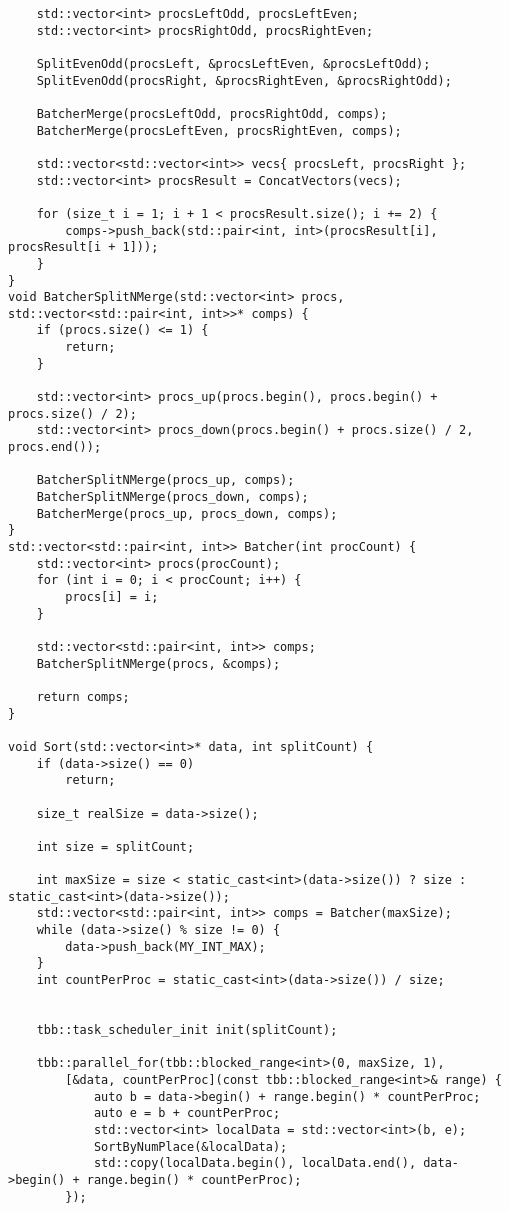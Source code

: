\documentclass{report}
\begin{document}
\begin{lstlisting}
    std::vector<int> procsLeftOdd, procsLeftEven;
    std::vector<int> procsRightOdd, procsRightEven;

    SplitEvenOdd(procsLeft, &procsLeftEven, &procsLeftOdd);
    SplitEvenOdd(procsRight, &procsRightEven, &procsRightOdd);

    BatcherMerge(procsLeftOdd, procsRightOdd, comps);
    BatcherMerge(procsLeftEven, procsRightEven, comps);

    std::vector<std::vector<int>> vecs{ procsLeft, procsRight };
    std::vector<int> procsResult = ConcatVectors(vecs);

    for (size_t i = 1; i + 1 < procsResult.size(); i += 2) {
        comps->push_back(std::pair<int, int>(procsResult[i], procsResult[i + 1]));
    }
}
void BatcherSplitNMerge(std::vector<int> procs, std::vector<std::pair<int, int>>* comps) {
    if (procs.size() <= 1) {
        return;
    }

    std::vector<int> procs_up(procs.begin(), procs.begin() + procs.size() / 2);
    std::vector<int> procs_down(procs.begin() + procs.size() / 2, procs.end());

    BatcherSplitNMerge(procs_up, comps);
    BatcherSplitNMerge(procs_down, comps);
    BatcherMerge(procs_up, procs_down, comps);
}
std::vector<std::pair<int, int>> Batcher(int procCount) {
    std::vector<int> procs(procCount);
    for (int i = 0; i < procCount; i++) {
        procs[i] = i;
    }

    std::vector<std::pair<int, int>> comps;
    BatcherSplitNMerge(procs, &comps);

    return comps;
}

void Sort(std::vector<int>* data, int splitCount) {
    if (data->size() == 0)
        return;

    size_t realSize = data->size();

    int size = splitCount;

    int maxSize = size < static_cast<int>(data->size()) ? size : static_cast<int>(data->size());
    std::vector<std::pair<int, int>> comps = Batcher(maxSize);
    while (data->size() % size != 0) {
        data->push_back(MY_INT_MAX);
    }
    int countPerProc = static_cast<int>(data->size()) / size;


    tbb::task_scheduler_init init(splitCount);

    tbb::parallel_for(tbb::blocked_range<int>(0, maxSize, 1),
        [&data, countPerProc](const tbb::blocked_range<int>& range) {
            auto b = data->begin() + range.begin() * countPerProc;
            auto e = b + countPerProc;
            std::vector<int> localData = std::vector<int>(b, e);
            SortByNumPlace(&localData);
            std::copy(localData.begin(), localData.end(), data->begin() + range.begin() * countPerProc);
        });


\end{lstlisting}
\end{document}
